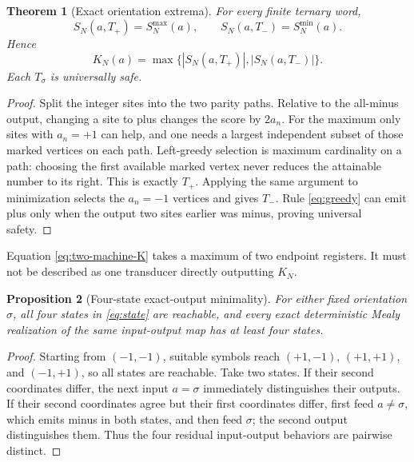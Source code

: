 \documentclass[11pt]{article}
\newtheorem{theorem}{Theorem}[section]
\newtheorem{proposition}[theorem]{Proposition}
\theoremstyle{definition}
\theoremstyle{remark}
\begin{document}
\begin{theorem}[Exact orientation extrema]
\label{thm:greedy}
For every finite ternary word,
\begin{equation}
 S_N(a,T_{+})=S_N^{\max}(a),\qquad
 S_N(a,T_{-})=S_N^{\min}(a).
 \label{eq:two-extrema}
\end{equation}
Hence
\begin{equation}
 K_N(a)=\max\{|S_N(a,T_+)|,|S_N(a,T_-)|\}.
 \label{eq:two-machine-K}
\end{equation}
Each $T_\sigma$ is universally safe.
\end{theorem}

\begin{proof}
Split the integer sites into the two parity paths.  Relative to the all-minus
output, changing a site to plus changes the score by $2a_n$.  For the maximum
only sites with $a_n=+1$ can help, and one needs a largest independent subset
of those marked vertices on each path.  Left-greedy selection is maximum
cardinality on a path: choosing the first available marked vertex never
reduces the attainable number to its right.  This is exactly $T_+$.  Applying
the same argument to minimization selects the $a_n=-1$ vertices and gives
$T_-$.  Rule \eqref{eq:greedy} can emit plus only when the output two sites
earlier was minus, proving universal safety.
\end{proof}

Equation \eqref{eq:two-machine-K} takes a maximum of two endpoint registers.
It must not be described as one transducer directly outputting $K_N$.

\begin{proposition}[Four-state exact-output minimality]
\label{prop:four-state}
For either fixed orientation $\sigma$, all four states in
\eqref{eq:state} are reachable, and every exact deterministic Mealy
realization of the same input-output map has at least four states.
\end{proposition}

\begin{proof}
Starting from $(-1,-1)$, suitable symbols reach
$(+1,-1)$, $(+1,+1)$, and $(-1,+1)$, so all states are reachable.  Take two
states.  If their second coordinates differ, the next input $a=\sigma$
immediately distinguishes their outputs.  If their second coordinates agree
but their first coordinates differ, first feed $a\ne\sigma$, which emits
minus in both states, and then feed $\sigma$; the second output distinguishes
them.  Thus the four residual input-output behaviors are pairwise distinct.
\end{proof}
\end{document}

